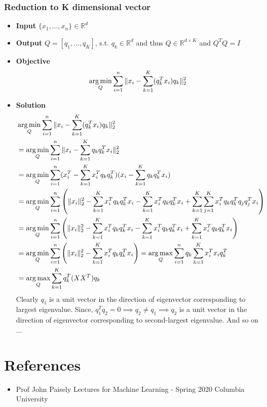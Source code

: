 \documentclass{article}
\begin{document}
\subsubsection{Reduction to K dimensional vector}
\begin{itemize}
    \item \textbf{Input} $\{x_1, \dots, x_n\} \in \mathbb{R}^d$
    \item \textbf{Output} $Q=[q_1, \dots, q_K]$, s.t. $q_k \in \mathbb{R}^d$ and thus $Q \in \mathbb{R}^{d \times K}$ and $Q^TQ=I$
    \item \textbf{Objective} 
        $$\operatorname*{arg\,min}_{Q} \sum_{i=1}^n \Vert x_i - \sum_{k=1}^K(q_k^Tx_i)q_k \Vert_2^2  $$
    \item \textbf{Solution} 
        \begin{align*}
            & \operatorname*{arg\,min}_{Q} \sum_{i=1}^n \Vert x_i - \sum_{k=1}^K(q_k^Tx_i)q_k \Vert_2^2\\
            &= \operatorname*{arg\,min}_{Q} \sum_{i=1}^n \Vert x_i - \sum_{k=1}^K q_kq_k^Tx_i \Vert_2^2 \\
            &= \operatorname*{arg\,min}_{Q} \sum_{i=1}^n (x_i^T - \sum_{k=1}^K x_i^Tq_kq_k^T)(x_i - \sum_{k=1}^K q_kq_k^Tx_i) \\
            &= \operatorname*{arg\,min}_{Q} \sum_{i=1}^n \left( \Vert x_i \Vert_2^2 - \sum_{k=1}^K x_i^Tq_kq_k^Tx_i - \sum_{k=1}^K x_i^Tq_kq_k^Tx_i + \sum_{k=1}^K\sum_{j=1}^K x_i^Tq_kq_k^Tq_jq_j^Tx_i \right)\\
            &= \operatorname*{arg\,min}_{Q} \sum_{i=1}^n \left( \Vert x_i \Vert_2^2 - \sum_{k=1}^K x_i^Tq_kq_k^Tx_i - \sum_{k=1}^K x_i^Tq_kq_k^Tx_i + \sum_{k=1}^K x_i^Tq_kq_k^Tx_i \right)\\
            &= \operatorname*{arg\,min}_{Q} \sum_{i=1}^n \left( \Vert x_i \Vert_2^2 - \sum_{k=1}^K x_i^Tq_kq_k^Tx_i \right)
            = \operatorname*{arg\,max}_{Q} \sum_{i=1}^n q_k\sum_{k=1}^K x_i^Tx_iq_k^T \\
            &= \operatorname*{arg\,max}_{Q} \sum_{k=1}^K q_k^T( XX^T )q_k
        \end{align*}
        Clearly $q_1$ is a unit vector in the direction of eigenvector corresponding to largest eigenvalue. Since, $q_1^Tq_2=0 \implies q_2\neq q_1 \implies q_2$ is a unit vector in the direction of eigenvector corresponding to second-largest eigenvalue.  And so on ...
\end{itemize}

\hrfullline

\section{References}
\begin{itemize}
    \item Prof John Paisely Lectures for Machine Learning - Spring 2020 Columbia University
\end{itemize}
\end{document}
